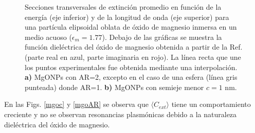 \begin{figure}[H]
	\quad%
	\caption{Secciones transversales de extinción promedio en función de la energía (eje inferior) y de la longitud de onda (eje superior) para una partícula elipsoidal oblata de óxido de magnesio inmersa en un medio acuoso ($\epsilon_m=1.77$). Debajo de las gráficas se muestra la función dieléctrica del óxido de magnesio obtenida a partir de la Ref. \cite{MgO} (parte real en azul, parte imaginaria en rojo). La línea recta que une los puntos experimentales fue obtenida mediante una interpolación. \textbf{a)} MgONPs con AR=2, excepto en el caso de una esfera (línea gris punteada) donde AR=1. \textbf{b)}  MgONPs con semieje menor $c=1$ nm.}\label{mgo}
\end{figure}

En las Figs. \ref{mgoc} y \ref{mgoAR} se observa que $\langle C_{ext}\rangle$ tiene un comportamiento creciente y no se observan resonancias plasmónicas debido a la naturaleza dieléctrica del óxido de magnesio.







